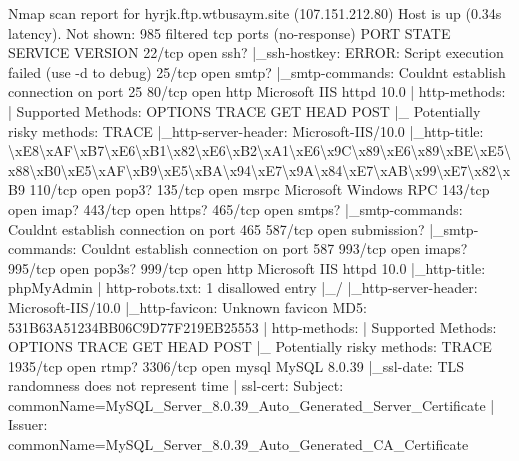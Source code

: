 \documentclass[
]{article}
\newenvironment{Shaded}{}{}
\newcommand{\NormalTok}[1]{#1}
\begin{document}
\begin{Shaded}
\begin{Highlighting}[]
\NormalTok{Nmap scan report for hyrjk.ftp.wtbusaym.site (107.151.212.80)}
\NormalTok{Host is up (0.34s latency).}
\NormalTok{Not shown: 985 filtered tcp ports (no{-}response)}
\NormalTok{PORT     STATE SERVICE     VERSION}
\NormalTok{22/tcp   open  ssh?}
\NormalTok{|\_ssh{-}hostkey: ERROR: Script execution failed (use {-}d to debug)}
\NormalTok{25/tcp   open  smtp?}
\NormalTok{|\_smtp{-}commands: Couldn\textquotesingle{}t establish connection on port 25}
\NormalTok{80/tcp   open  http        Microsoft IIS httpd 10.0}
\NormalTok{| http{-}methods:}
\NormalTok{|   Supported Methods: OPTIONS TRACE GET HEAD POST}
\NormalTok{|\_  Potentially risky methods: TRACE}
\NormalTok{|\_http{-}server{-}header: Microsoft{-}IIS/10.0}
\NormalTok{|\_http{-}title: \textbackslash{}xE8\textbackslash{}xAF\textbackslash{}xB7\textbackslash{}xE6\textbackslash{}xB1\textbackslash{}x82\textbackslash{}xE6\textbackslash{}xB2\textbackslash{}xA1\textbackslash{}xE6\textbackslash{}x9C\textbackslash{}x89\textbackslash{}xE6\textbackslash{}x89\textbackslash{}xBE\textbackslash{}xE5\textbackslash{}x88\textbackslash{}xB0\textbackslash{}xE5\textbackslash{}xAF\textbackslash{}xB9\textbackslash{}xE5\textbackslash{}xBA\textbackslash{}x94\textbackslash{}xE7\textbackslash{}x9A\textbackslash{}x84\textbackslash{}xE7\textbackslash{}xAB\textbackslash{}x99\textbackslash{}xE7\textbackslash{}x82\textbackslash{}xB9}
\NormalTok{110/tcp  open  pop3?}
\NormalTok{135/tcp  open  msrpc       Microsoft Windows RPC}
\NormalTok{143/tcp  open  imap?}
\NormalTok{443/tcp  open  https?}
\NormalTok{465/tcp  open  smtps?}
\NormalTok{|\_smtp{-}commands: Couldn\textquotesingle{}t establish connection on port 465}
\NormalTok{587/tcp  open  submission?}
\NormalTok{|\_smtp{-}commands: Couldn\textquotesingle{}t establish connection on port 587}
\NormalTok{993/tcp  open  imaps?}
\NormalTok{995/tcp  open  pop3s?}
\NormalTok{999/tcp  open  http        Microsoft IIS httpd 10.0}
\NormalTok{|\_http{-}title: phpMyAdmin}
\NormalTok{| http{-}robots.txt: 1 disallowed entry}
\NormalTok{|\_/}
\NormalTok{|\_http{-}server{-}header: Microsoft{-}IIS/10.0}
\NormalTok{|\_http{-}favicon: Unknown favicon MD5: 531B63A51234BB06C9D77F219EB25553}
\NormalTok{| http{-}methods:}
\NormalTok{|   Supported Methods: OPTIONS TRACE GET HEAD POST}
\NormalTok{|\_  Potentially risky methods: TRACE}
\NormalTok{1935/tcp open  rtmp?}
\NormalTok{3306/tcp open  mysql       MySQL 8.0.39}
\NormalTok{|\_ssl{-}date: TLS randomness does not represent time}
\NormalTok{| ssl{-}cert: Subject: commonName=MySQL\_Server\_8.0.39\_Auto\_Generated\_Server\_Certificate}
\NormalTok{| Issuer: commonName=MySQL\_Server\_8.0.39\_Auto\_Generated\_CA\_Certificate}

\end{Highlighting}
\end{Shaded}
\end{document}
